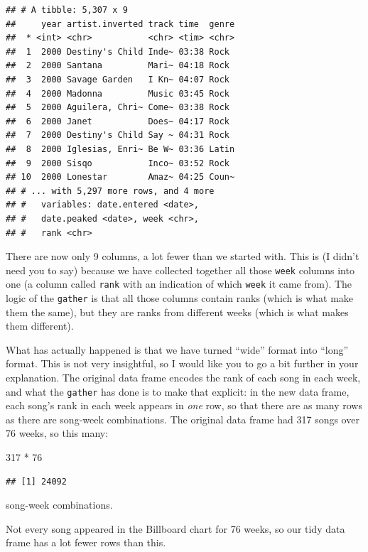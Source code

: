 \documentclass[]{tufte-book}
\newenvironment{Shaded}{}{}
\newcommand{\DecValTok}[1]{\textcolor[rgb]{0.25,0.63,0.44}{#1}}
\newcommand{\OperatorTok}[1]{\textcolor[rgb]{0.40,0.40,0.40}{#1}}
\newcommand{\StringTok}[1]{\textcolor[rgb]{0.25,0.44,0.63}{#1}}
\theoremstyle{definition}
\theoremstyle{definition}
\theoremstyle{definition}
\theoremstyle{remark}
\begin{document}
\begin{verbatim}
## # A tibble: 5,307 x 9
##     year artist.inverted track time  genre
##  * <int> <chr>           <chr> <tim> <chr>
##  1  2000 Destiny's Child Inde~ 03:38 Rock 
##  2  2000 Santana         Mari~ 04:18 Rock 
##  3  2000 Savage Garden   I Kn~ 04:07 Rock 
##  4  2000 Madonna         Music 03:45 Rock 
##  5  2000 Aguilera, Chri~ Come~ 03:38 Rock 
##  6  2000 Janet           Does~ 04:17 Rock 
##  7  2000 Destiny's Child Say ~ 04:31 Rock 
##  8  2000 Iglesias, Enri~ Be W~ 03:36 Latin
##  9  2000 Sisqo           Inco~ 03:52 Rock 
## 10  2000 Lonestar        Amaz~ 04:25 Coun~
## # ... with 5,297 more rows, and 4 more
## #   variables: date.entered <date>,
## #   date.peaked <date>, week <chr>,
## #   rank <chr>
\end{verbatim}

There are now only 9 columns, a lot fewer than we started with. This is
(I didn't need you to say) because we have collected together all those
\texttt{week} columns into one (a column called \texttt{rank} with an
indication of which \texttt{week} it came from). The logic of the
\texttt{gather} is that all those columns contain ranks (which is what
make them the same), but they are ranks from different weeks (which is
what makes them different).

What has actually happened is that we have turned ``wide'' format into
``long'' format. This is not very insightful, so I would like you to go
a bit further in your explanation. The original data frame encodes the
rank of each song in each week, and what the \texttt{gather} has done is
to make that explicit: in the new data frame, each song's rank in each
week appears in \emph{one} row, so that there are as many rows as there
are song-week combinations. The original data frame had 317 songs over
76 weeks, so this many:

\begin{Shaded}
\begin{Highlighting}[]
\DecValTok{317} \OperatorTok{*}\StringTok{ }\DecValTok{76}
\end{Highlighting}
\end{Shaded}

\begin{verbatim}
## [1] 24092
\end{verbatim}

song-week combinations.

Not every song appeared in the Billboard chart for 76 weeks, so our tidy
data frame has a lot fewer rows than this.
\end{document}
